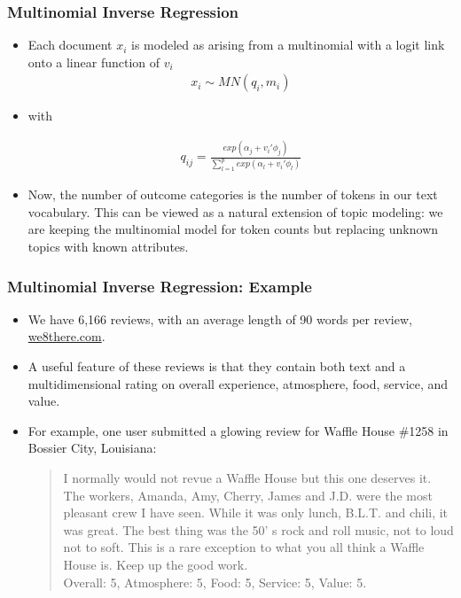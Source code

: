 \documentclass[
  shownotes,
  xcolor={svgnames},
  hyperref={colorlinks,citecolor=DarkBlue,linkcolor=DarkRed,urlcolor=DarkBlue}
  , aspectratio=169]{beamer}
\begin{document}
\begin{frame}
\frametitle{Multinomial Inverse Regression}

\begin{itemize}
\item Each document $x_i$ is modeled as arising from a multinomial with a logit link onto a linear function of $v_i$
\medskip
\begin{align}
x_i \sim MN(q_i,m_i)
\end{align}

\item with


\begin{align}
q_{ij}=\frac{exp(\alpha_j + v_i'\phi_j)}{\sum_{l=1}^p exp(\alpha_l + v_i'\phi_l)}
\end{align}
\medskip

\item Now, the number of outcome categories is the number of tokens in our text vocabulary. This can be viewed as a natural extension of topic modeling: we are keeping the multinomial model for token counts but replacing unknown topics with known attributes.
\end{itemize}



\end{frame}


\begin{frame}
\frametitle{Multinomial Inverse Regression: Example}

\begin{itemize}


\item We have 6,166 reviews, with an average length of 90 words per review, \url{we8there.com}. 
\medskip
\item A useful feature of these reviews is that they contain both text and a multidimensional rating on overall experience, atmosphere, food, service, and value. 
\medskip
\item For example, one user submitted a glowing review for Waffle House \#1258 in Bossier City, Louisiana: 
\medskip

\begin{quote}
I normally would not revue a Waffle House but this one deserves it. The workers, Amanda, Amy, Cherry, James and J.D. were the most pleasant crew I have seen. While it was only lunch, B.L.T. and chili, it was great. The best thing was the 50’ s rock and roll music, not to loud not to soft. This is a rare exception to what you all think a Waffle House is. Keep up the good work. \\
Overall: 5, Atmosphere: 5, Food: 5, Service: 5, Value: 5.  
 \end{quote} 


\end{itemize}





\end{frame}
\end{document}
